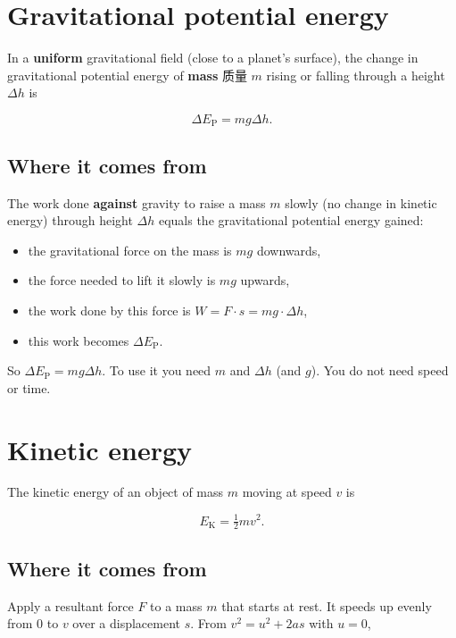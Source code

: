 \documentclass[11pt]{article}
\begin{document}
\section*{Gravitational potential energy}

In a \textbf{uniform} gravitational field (close to a planet's surface), the change in gravitational potential energy of \textbf{mass} 质量 $m$ rising or falling through a height $\Delta h$ is

\[
\Delta E_{\text{P}} = m g \Delta h.
\]

\subsection*{Where it comes from}

The work done \textbf{against} gravity to raise a mass $m$ slowly (no change in kinetic energy) through height $\Delta h$ equals the gravitational potential energy gained:

\begin{itemize}
\item the gravitational force on the mass is $mg$ downwards,

\item the force needed to lift it slowly is $mg$ upwards,

\item the work done by this force is $W = F \cdot s = mg \cdot \Delta h$,

\item this work becomes $\Delta E_{\text{P}}$.

\end{itemize}

So $\Delta E_{\text{P}} = mg \Delta h$. To use it you need $m$ and $\Delta h$ (and $g$). You do not need speed or time.

\section*{Kinetic energy}

The kinetic energy of an object of mass $m$ moving at speed $v$ is

\[
E_{\text{K}} = \tfrac{1}{2} m v^{2}.
\]

\subsection*{Where it comes from}

Apply a resultant force $F$ to a mass $m$ that starts at rest. It speeds up evenly from $0$ to $v$ over a displacement $s$. From $v^{2} = u^{2} + 2as$ with $u = 0$,
\end{document}
